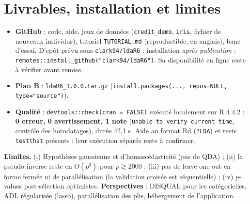 \documentclass[10.5pt,a4paper]{article}
\newcommand{\code}[1]{\texttt{#1}}
\begin{document}
\section{Livrables, installation et limites}
\begin{itemize}
\item \textbf{GitHub} : code, aide, jeux de donn\'ees (\code{credit\_demo}, \code{iris}, fichier de nouveaux individus), tutoriel \code{TUTORIAL.md} (reproductible, en anglais), banc d'essai. D'ep\^ot pr\'evu sous \code{clark94/ldaR6} ; installation \emph{apr\`es publication} : \code{remotes::install\_github("clark94/ldaR6")}. Sa disponibilit\'e en ligne reste \`a v\'erifier avant remise.
\item \textbf{Plan B} : \code{ldaR6\_1.0.0.tar.gz} (\code{install.packages(..., repos=NULL, type="source")}).
\item \textbf{Qualit\'e} : \code{devtools::check(cran = FALSE)} ex\'ecut\'e localement sur R 4.4.2 : \textbf{0 erreur, 0 avertissement, 1 note} (\code{unable to verify current time}, contr\^ole des horodatages), dur\'ee 42,1 s. Aide au format Rd (\code{?LDA}) et tests \code{testthat} pr\'esents ; leur ex\'ecution s\'epar\'ee reste \`a confirmer.
\end{itemize}
\textbf{Limites.} (i) Hypoth\`eses gaussienne et d'homosc\'edasticit\'e (pas de QDA) ; (ii) la pseudo-inverse reste en $O(p^3)$ pour $p\gtrsim 2000$ ; (iii) pas de leave-one-out en forme ferm\'ee ni de parall\'elisation (la validation crois\'ee est s\'equentielle) ; (iv) $p$-values post-s\'election optimistes. \textbf{Perspectives} : DISQUAL pour les cat\'egorielles, ADL r\'egularis\'ee (lasso), parall\'elisation des plis, h\'ebergement de l'application.

\appendix
\end{document}

